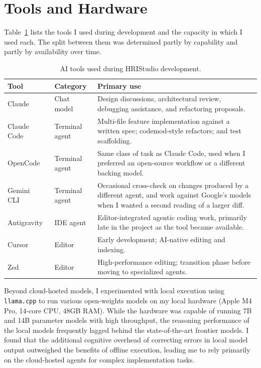 \section{Tools and Hardware}
\label{sec:ai-tools}

Table~\ref{tbl:ai-tools} lists the tools I used during development and the capacity in which I used each. The split between them was determined partly by capability and partly by availability over time.

\begin{table}[htbp]
\centering
\footnotesize
\begin{tabular}{|l|l|p{3.4in}|}
\hline
\textbf{Tool} & \textbf{Category} & \textbf{Primary use} \\
\hline
Claude~\cite{Anthropic2024Claude} & Chat model & Design discussions, architectural review, debugging assistance, and refactoring proposals. \\
\hline
Claude Code~\cite{AnthropicClaudeCode} & Terminal agent & Multi-file feature implementation against a written spec; codemod-style refactors; and test scaffolding. \\
\hline
OpenCode~\cite{OpenCode} & Terminal agent & Same class of task as Claude Code, used when I preferred an open-source workflow or a different backing model. \\
\hline
Gemini CLI~\cite{GeminiCLI} & Terminal agent & Occasional cross-check on changes produced by a different agent, and work against Google's models when I wanted a second reading of a larger diff. \\
\hline
Antigravity~\cite{GoogleAntigravity} & IDE agent & Editor-integrated agentic coding work, primarily late in the project as the tool became available. \\
\hline
Cursor~\cite{CursorEditor} & Editor & Early development; AI-native editing and indexing. \\
\hline
Zed~\cite{ZedEditor} & Editor & High-performance editing; transition phase before moving to specialized agents. \\
\hline
\end{tabular}
\caption{AI tools used during HRIStudio development.}
\label{tbl:ai-tools}
\end{table}

Beyond cloud-hosted models, I experimented with local execution using \texttt{llama.cpp} to run various open-weights models on my local hardware (Apple M4 Pro, 14-core CPU, 48GB RAM). While the hardware was capable of running 7B and 14B parameter models with high throughput, the reasoning performance of the local models frequently lagged behind the state-of-the-art frontier models. I found that the additional cognitive overhead of correcting errors in local model output outweighed the benefits of offline execution, leading me to rely primarily on the cloud-hosted agents for complex implementation tasks.

